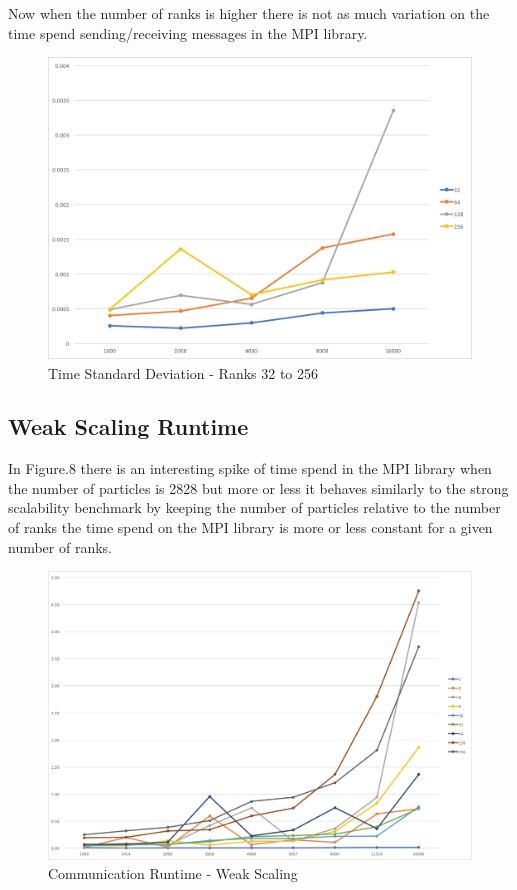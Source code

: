 \documentclass[12pt]{article} %
\begin{document}
\newpage

Now when the number of ranks is higher there is not as much variation on the time spend sending/receiving messages in the MPI library. 

\begin{figure}[htb]
\caption{Time Standard Deviation - Ranks 32 to 256}\label{fig:benchmark05}
\centering
\includegraphics[width=\textwidth,keepaspectratio]{imgs/img09.png}
\end{figure}

\newpage

\subsection{Weak Scaling Runtime}

In Figure.8 there is an interesting spike of time spend in the MPI library when the number of particles is 2828 but more or less it behaves similarly to the strong scalability benchmark by keeping the number of particles relative to the number of ranks the time spend on the MPI library is more or less constant for a given number of ranks.

\begin{figure}[htb]
\caption{Communication Runtime - Weak Scaling}\label{fig:benchmark05}
\centering
\includegraphics[width=\textwidth,keepaspectratio]{imgs/img06.png}
\end{figure}
\end{document}
